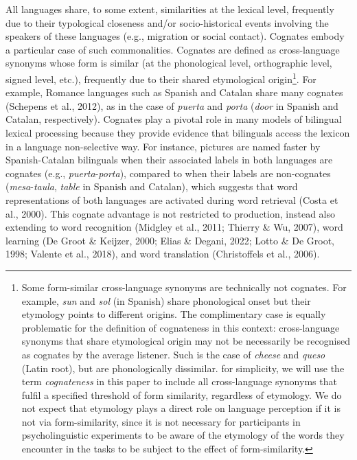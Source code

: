 \documentclass[
  english,
  man,floatsintext]{apa7}
\begin{document}
All languages share, to some extent, similarities at the lexical level, frequently due to their typological closeness and/or socio-historical events involving the speakers of these languages (e.g., migration or social contact). Cognates embody a particular case of such commonalities. Cognates are defined as cross-language synonyms whose form is similar (at the phonological level, orthographic level, signed level, etc.), frequently due to their shared etymological origin\footnote{Some form-similar cross-language synonyms are technically not cognates. For example, \emph{sun} and \emph{sol} (in Spanish) share phonological onset but their etymology points to different origins. The complimentary case is equally problematic for the definition of cognateness in this context: cross-language synonyms that share etymological origin may not be necessarily be recognised as cognates by the average listener. Such is the case of \emph{cheese} and \emph{queso} (Latin root), but are phonologically dissimilar. for simplicity, we will use the term \emph{cognateness} in this paper to include all cross-language synonyms that fulfil a specified threshold of form similarity, regardless of etymology. We do not expect that etymology plays a direct role on language perception if it is not via form-similarity, since it is not necessary for participants in psycholinguistic experiments to be aware of the etymology of the words they encounter in the tasks to be subject to the effect of form-similarity.}. For example, Romance languages such as Spanish and Catalan share many cognates (Schepens et al., 2012), as in the case of \emph{puerta} and \emph{porta} (\emph{door} in Spanish and Catalan, respectively). Cognates play a pivotal role in many models of bilingual lexical processing because they provide evidence that bilinguals access the lexicon in a language non-selective way. For instance, pictures are named faster by Spanish-Catalan bilinguals when their associated labels in both languages are cognates (e.g., \emph{puerta}-\emph{porta}), compared to when their labels are non-cognates (\emph{mesa}-\emph{taula}, \emph{table} in Spanish and Catalan), which suggests that word representations of both languages are activated during word retrieval (Costa et al., 2000). This cognate advantage is not restricted to production, instead also extending to word recognition (Midgley et al., 2011; Thierry \& Wu, 2007), word learning (De Groot \& Keijzer, 2000; Elias \& Degani, 2022; Lotto \& De Groot, 1998; Valente et al., 2018), and word translation (Christoffels et al., 2006).
\end{document}
